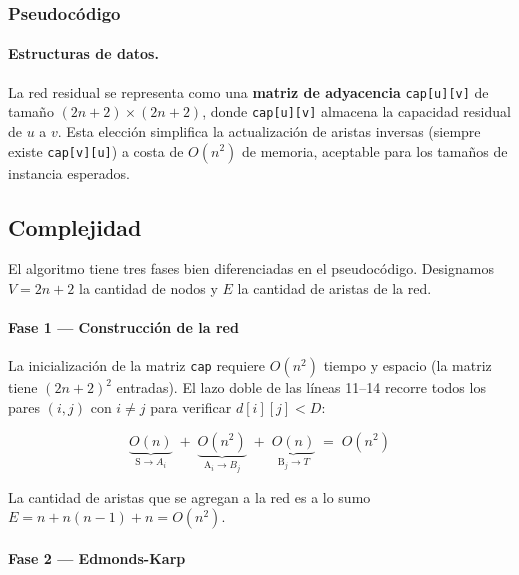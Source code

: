 \subsubsection{Pseudocódigo}



\paragraph{Estructuras de datos.}
La red residual se representa como una \textbf{matriz de adyacencia} \texttt{cap[u][v]} de tamaño $(2n+2) \times (2n+2)$, donde \texttt{cap[u][v]} almacena la capacidad residual de $u$ a $v$. Esta elección simplifica la actualización de aristas inversas (siempre existe \texttt{cap[v][u]}) a costa de $O(n^2)$ de memoria, aceptable para los tamaños de instancia esperados.

\subsection{Complejidad}

El algoritmo tiene tres fases bien diferenciadas en el pseudocódigo. Designamos
$V = 2n+2$ la cantidad de nodos y $E$ la cantidad de aristas de la red.

\paragraph{Fase 1 — Construcción de la red }

La inicialización de la matriz \texttt{cap} requiere $O(n^2)$ tiempo y espacio
(la matriz tiene $(2n+2)^2$ entradas). El lazo doble de las líneas 11–14
recorre todos los pares $(i,j)$ con $i \neq j$ para verificar $d[i][j] < D$:

\begin{equation*}
\underbrace{O(n)}_{\text{S} \to A_i}
\;+\;
\underbrace{O(n^2)}_{\text{A}_i \to B_j}
\;+\;
\underbrace{O(n)}_{\text{B}_j \to T}
\;=\; O(n^2)
\end{equation*}

La cantidad de aristas que se agregan a la red es a lo sumo
$E = n + n(n-1) + n = O(n^2)$.

\paragraph{Fase 2 — Edmonds-Karp }

